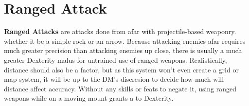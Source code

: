 \section{Ranged Attack}
\textbf{Ranged Attacks} are attacks done from afar with projectile-based weaponry. whether it be a simple rock or an arrow. Because attacking enemies afar requires much greater precision than attacking enemies up close, there is usually a much greater Dexterity-malus for untrained use of ranged weapons. Realistically, distance should also be a factor, but as this system won't even create a grid or map system, it will be up to the DM's discresion to decide how much will distance affect accuracy.\newline
Without any skills or feats to negate it, using ranged weapons while on a moving mount grants a  to Dexterity.
